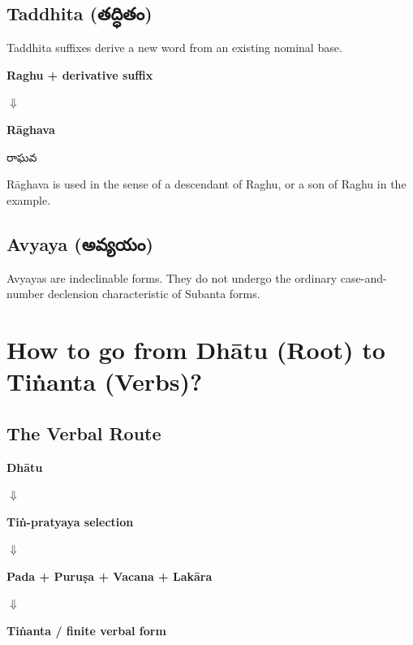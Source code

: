 \documentclass[12pt,a4paper]{article}
\newcommand{\te}[1]{{\telugufont #1}}
\begin{document}
\subsection{Taddhita (\te{తద్ధితం})}

Taddhita suffixes derive a new word from an existing nominal base.

\begin{mainbox}
\centering
\textbf{Raghu + derivative suffix}

\vspace{2mm}
$\Downarrow$

\vspace{2mm}
\textbf{Rāghava}

\vspace{2mm}
\te{రాఘవ}
\end{mainbox}

Rāghava is used in the sense of a descendant of Raghu, or a son
of Raghu in the example.

\subsection{Avyaya (\te{అవ్యయం})}

Avyayas are indeclinable forms. They do not undergo the ordinary
case-and-number declension characteristic of Subanta forms.

\newpage 

\section{How to go from Dhātu (Root) to Tiṅanta (Verbs)?}

\subsection{The Verbal Route}

\begin{mainbox}
\centering
\textbf{Dhātu}

$\Downarrow$

\textbf{Tiṅ-pratyaya selection}

$\Downarrow$

\textbf{Pada + Puruṣa + Vacana + Lakāra}

$\Downarrow$

\textbf{Tiṅanta / finite verbal form}
\end{mainbox}
\end{document}
